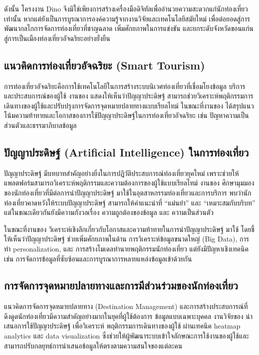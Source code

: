 ดังนั้น โครงงาน Dino จึงมิใช่เพียงการสร้างเครื่องมือดิจิทัลเพื่ออำนวยความสะดวกแก่นักท่องเที่ยวเท่านั้น หากแต่ยังเป็นการบูรณาการองค์ความรู้จากงานวิจัยและเทคโนโลยีสมัยใหม่ เพื่อต่อยอดสู่การพัฒนากลไกการจัดการท่องเที่ยวที่ชาญฉลาด เพิ่มศักยภาพในการแข่งขัน และยกระดับจังหวัดขอนแก่นสู่การเป็นเมืองท่องเที่ยวอัจฉริยะอย่างยั่งยืน

\subsection{แนวคิดการท่องเที่ยวอัจฉริยะ (Smart Tourism)}

การท่องเที่ยวอัจฉริยะคือการใช้เทคโนโลยีในการสร้างระบบนิเวศท่องเที่ยวที่เชื่อมโยงข้อมูล บริการ และประสบการณ์ของผู้ใช้ งานของ \textcite{ma2025} แสดงให้เห็นว่าปัญญาประดิษฐ์ สามารถช่วยวิเคราะห์พฤติกรรมการเดินทางของผู้ใช้และปรับปรุงการจัดการจุดหมายปลายทางแบบเรียลไทม์ ในขณะที่งานของ \textcite{milton2023} ได้สรุปแนวโน้มความท้าทายและโอกาสของการใช้ปัญญาประดิษฐ์ในการท่องเที่ยวอัจฉริยะ เช่น ปัญหาความเป็นส่วนตัวและธรรมาภิบาลข้อมูล

\subsection{ปัญญาประดิษฐ์ (Artificial Intelligence) ในการท่องเที่ยว}

ปัญญาประดิษฐ์ มีบทบาทสำคัญอย่างยิ่งในการปฏิวัติประสบการณ์ท่องเที่ยวยุคใหม่ เพราะช่วยให้แพลตฟอร์มสามารถวิเคราะห์พฤติกรรมและความต้องการของผู้ใช้แบบเรียลไทม์ งานของ \textcite{sousa2024} ศึกษามุมมองของนักท่องเที่ยวที่มีต่อการนำปัญญาประดิษฐ์ มาใช้ในอุตสาหกรรมท่องเที่ยวและการบริการ พบว่านักท่องเที่ยวคาดหวังให้ระบบปัญญาประดิษฐ์ สามารถให้คำแนะนำที่ ``แม่นยำ'' และ ``เหมาะสมกับบริบท'' แต่ในขณะเดียวกันยังมีความกังวลเรื่อง ความถูกต้องของข้อมูล และ ความเป็นส่วนตัว

ในขณะที่งานของ \textcite{milton2023} วิเคราะห์เชิงลึกเกี่ยวกับโอกาสและความท้าทายในการนำปัญญาประดิษฐ์ มาใช้ โดยชี้ให้เห็นว่าปัญญาประดิษฐ์ ช่วยเพิ่มศักยภาพในด้าน การวิเคราะห์ข้อมูลขนาดใหญ่ (Big Data), การทำ personalization, และ การสร้างโมเดลทำนายพฤติกรรมนักท่องเที่ยว แต่ยังมีปัญหาเชิงเทคนิค เช่น การจัดการข้อมูลที่ซับซ้อนและการบูรณาการหลายแหล่งข้อมูลเข้าด้วยกัน

\subsection{การจัดการจุดหมายปลายทางและการมีส่วนร่วมของนักท่องเที่ยว}

แนวคิดการจัดการจุดหมายปลายทาง (Destination Management) และการสร้างประสบการณ์ที่ดึงดูดนักท่องเที่ยวมีความสำคัญอย่างมากในยุคที่ผู้ใช้ต้องการ ข้อมูลแบบเฉพาะบุคคล งานวิจัยของ \textcite{ma2025} นำเสนอการใช้ปัญญาประดิษฐ์ เพื่อวิเคราะห์ พฤติกรรมการเดินทางของผู้ใช้ ผ่านเทคนิค heatmap analytics และ data visualization ซึ่งช่วยให้ผู้พัฒนาระบบเข้าใจลักษณะการใช้งานของผู้ใช้และสามารถปรับกลยุทธ์การนำเสนอข้อมูลให้ตรงตามความสนใจของแต่ละคน

